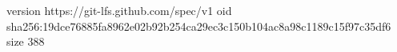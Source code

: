 version https://git-lfs.github.com/spec/v1
oid sha256:19dce76885fa8962e02b92b254ca29ec3c150b104ac8a98c1189c15f97c35df6
size 388
